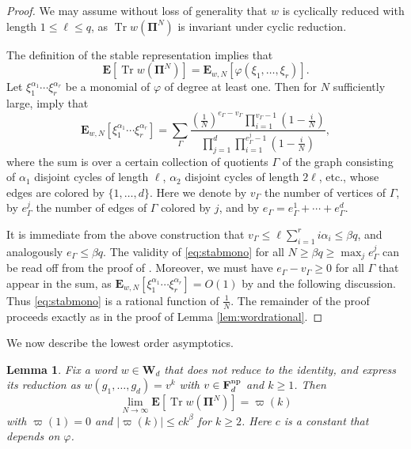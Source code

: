 \documentclass[10pt,reqno]{amsart}
\newtheorem{lem}[thm]{Lemma}
\theoremstyle{definition}
\theoremstyle{remark}
\numberwithin{equation}{section}
\numberwithin{figure}{section}
\numberwithin{table}{section}
\newcommand{\tr}{\mathop{\mathrm{Tr}}}
\begin{document}
\begin{proof}
We may assume without loss of generality that $w$ is cyclically reduced
with length $1\le\ell\le q$, as $\tr w(\boldsymbol{\Pi}^N)$ is invariant 
under cyclic reduction.

The definition of the stable representation implies that
\begin{equation}
\label{eq:stablehp}
	\mathbf{E}[\tr w(\boldsymbol{\Pi}^N)] =
	\mathbf{E}_{w,N}[\varphi(\xi_1,\ldots,\xi_r)].
\end{equation}
Let $\xi_1^{\alpha_1}\cdots \xi_r^{\alpha_r}$ be a monomial 
of $\varphi$ of degree at least one. Then for $N$ sufficiently large,
\cite[Example 3.6, Definition 6.6, and Proposition 6.8]{HP23} imply that
\begin{equation}
\label{eq:stabmono}
	\mathbf{E}_{w,N}[\xi_1^{\alpha_1}\cdots \xi_r^{\alpha_r}]
	=
        \sum_\Gamma
        \frac{
        (\frac{1}{N})^{e_\Gamma-v_\Gamma}
        \prod_{i=1}^{v_\Gamma-1}(1-\frac{i}{N})}
        {\prod_{j=1}^d \prod_{i=1}^{e_\Gamma^j-1} (1-\frac{i}{N})},
\end{equation}
where the sum is over a certain collection of quotients $\Gamma$ of the 
graph consisting of $\alpha_1$ disjoint cycles of length $\ell$, 
$\alpha_2$ disjoint cycles of length $2\ell$, etc., whose edges are 
colored by $\{1,\ldots,d\}$. Here we denote by
$v_\Gamma$ the number of vertices of $\Gamma$, 
by $e_\Gamma^j$ the number of edges of $\Gamma$ colored by $j$,
and by $e_\Gamma=e_\Gamma^1+\cdots+e_\Gamma^d$.

It is immediate from the above construction that $v_\Gamma \le 
\ell\sum_{i=1}^r i\alpha_i \le \beta q$, and analogously $e_\Gamma \le 
\beta q$. The validity of \eqref{eq:stabmono} for all $N\ge \beta q\ge 
\max_j e_\Gamma^j$ can be read off from the proof of \cite[Proposition 
6.8]{HP23}. Moreover, we must have $e_\Gamma -v_\Gamma \ge 0$ for all 
$\Gamma$ that appear in the sum, as 
$\mathbf{E}_{w,N}[\xi_1^{\alpha_1}\cdots \xi_r^{\alpha_r}]=O(1)$ by 
\cite[Theorem 1.3]{HP23} and the following discussion.
Thus \eqref{eq:stabmono} is a rational function of $\frac{1}{N}$.
The remainder of the proof proceeds exactly as in the proof of
Lemma \ref{lem:wordrational}.
\end{proof}

We now describe the lowest order asymptotics.

\begin{lem}
\label{lem:stablenica}
Fix a word $w\in\mathbf{W}_d$ that does not reduce to the identity, and express 
its reduction as $w(g_1,\ldots,g_d)=v^k$ with
$v\in\mathbf{F}_d^{\rm np}$ and $k\ge 1$. Then
$$
        \lim_{N\to\infty}
        \mathbf{E}[\tr w(\boldsymbol{\Pi}^N)] = \varpi(k)
$$
with $\varpi(1)=0$ and $|\varpi(k)|\le c k^\beta$ for
$k\ge 2$. Here $c$ is a constant that depends on $\varphi$.
\end{lem}
\end{document}
